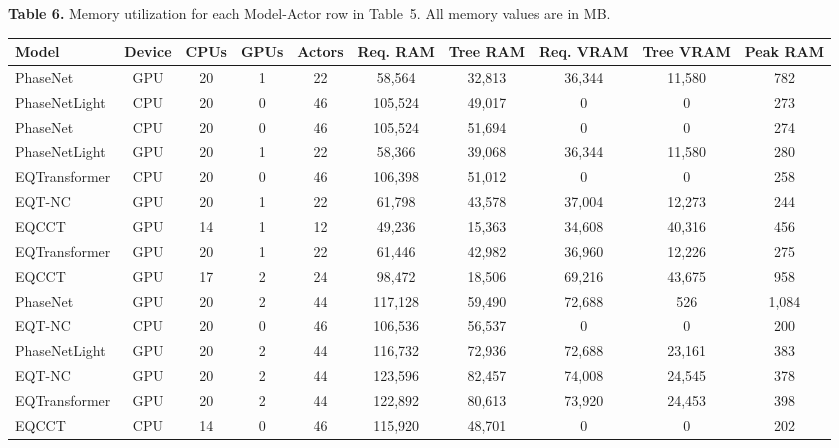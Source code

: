 \clearpage
\begin{landscape}

\begin{center}
\textbf{Table 6.} Memory utilization for each Model-Actor row in Table~5. All memory values are in MB.

\vspace{1em}
\small
\begin{tabular}{lccccccccc}
\toprule
\textbf{Model} & \textbf{Device} & \textbf{CPUs} & \textbf{GPUs} & \textbf{Actors} & \textbf{Req. RAM} & \textbf{Tree RAM} & \textbf{Req. VRAM} & \textbf{Tree VRAM} & \textbf{Peak RAM} \\
\midrule
PhaseNet      & GPU & 20 & 1 & 22 & 58,564  & 32,813 & 36,344 & 11,580 & 782 \\
PhaseNetLight & CPU & 20 & 0 & 46 & 105,524 & 49,017 & 0      & 0      & 273 \\
PhaseNet      & CPU & 20 & 0 & 46 & 105,524 & 51,694 & 0      & 0      & 274 \\
PhaseNetLight & GPU & 20 & 1 & 22 & 58,366  & 39,068 & 36,344 & 11,580 & 280 \\
EQTransformer & CPU & 20 & 0 & 46 & 106,398 & 51,012 & 0      & 0      & 258 \\
EQT-NC        & GPU & 20 & 1 & 22 & 61,798  & 43,578 & 37,004 & 12,273 & 244 \\
EQCCT         & GPU & 14 & 1 & 12 & 49,236  & 15,363 & 34,608 & 40,316 & 456 \\
EQTransformer & GPU & 20 & 1 & 22 & 61,446  & 42,982 & 36,960 & 12,226 & 275 \\
EQCCT         & GPU & 17 & 2 & 24 & 98,472  & 18,506 & 69,216 & 43,675 & 958 \\
PhaseNet      & GPU & 20 & 2 & 44 & 117,128 & 59,490 & 72,688 & 526    & 1,084 \\
EQT-NC        & CPU & 20 & 0 & 46 & 106,536 & 56,537 & 0      & 0      & 200 \\
PhaseNetLight & GPU & 20 & 2 & 44 & 116,732 & 72,936 & 72,688 & 23,161 & 383 \\
EQT-NC        & GPU & 20 & 2 & 44 & 123,596 & 82,457 & 74,008 & 24,545 & 378 \\
EQTransformer & GPU & 20 & 2 & 44 & 122,892 & 80,613 & 73,920 & 24,453 & 398 \\
EQCCT         & CPU & 14 & 0 & 46 & 115,920 & 48,701 & 0      & 0      & 202 \\
\bottomrule
\end{tabular}
\end{center}

\end{landscape}
